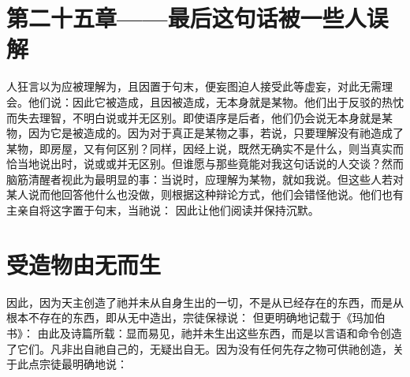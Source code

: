 
\section{第二十五章——最后这句话被一些人误解}

人狂言以为应被理解为，且因置于句末，便妄图迫人接受此等虚妄，对此无需理会。他们说：因此它被造成，且因被造成，无本身就是某物。他们出于反驳的热忱而失去理智，不明白说或并无区别。即使语序是后者，他们仍会说无本身就是某物，因为它是被造成的。因为对于真正是某物之事，若说，只要理解没有祂造成了某物，即房屋，又有何区别？同样，因经上说，既然无确实不是什么，则当真实而恰当地说出时，说或或并无区别。但谁愿与那些竟能对我这句话说的人交谈？然而脑筋清醒者视此为最明显的事：当说时，应理解为某物，就如我说。但这些人若对某人说而他回答他什么也没做，则根据这种辩论方式，他们会错怪他说。他们也有主亲自将这字置于句末，当祂说： 因此让他们阅读并保持沉默。\par


\section{受造物由无而生}

因此，因为天主创造了祂并未从自身生出的一切，不是从已经存在的东西，而是从根本不存在的东西，即从无中造出，宗徒保禄说： 但更明确地记载于《玛加伯书》： 由此及诗篇所载：显而易见，祂并未生出这些东西，而是以言语和命令创造了它们。凡非出自祂自己的，无疑出自无。因为没有任何先存之物可供祂创造，关于此点宗徒最明确地说：\par


